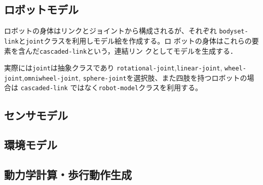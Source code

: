  \subsection{ロボットモデル}

ロボットの身体はリンクとジョイントから構成されるが、それぞれ
\verb|bodyset-link|と\verb|joint|クラスを利用しモデル絵を作成する。ロ
ボットの身体はこれらの要素を含んだ\verb|cascaded-link|という，連結リン
クとしてモデルを生成する．

実際には\verb|joint|は抽象クラスであり
\verb|rotational-joint|,\verb|linear-joint|,
\verb|wheel-joint|,\verb|omniwheel-joint|,
\verb|sphere-joint|を選択肢、また四肢を持つロボットの場合は
\verb|cascaded-link|
ではなく\verb|robot-model|クラスを利用する。

  
  
  
 \subsection{センサモデル}
  
 \subsection{環境モデル}
  
 \subsection{動力学計算・歩行動作生成}
  
